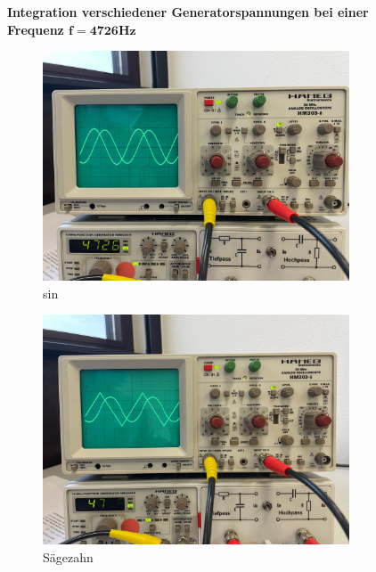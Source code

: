 \begin{figure}
  
  \centering
  \textbf{Integration verschiedener Generatorspannungen bei einer Frequenz $\symbf{f = 4726\unit{\hertz}}$}\par\medskip
  \begin{subfigure}{0.48\textwidth}
    \centering
    \includegraphics[scale=0.1]{content/sinInt.png}
    \caption{sin}
  \end{subfigure}
  \hfill
  \begin{subfigure}{0.48\textwidth}
    \centering
    \includegraphics[scale=0.1]{content/saegInt.png}
    \caption{Sägezahn}
  \end{subfigure}
  \caption{}
  \label{fig:abb9}
\end{figure}

